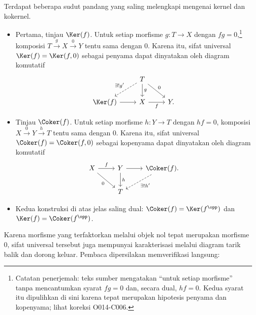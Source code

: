 Terdapat beberapa sudut pandang yang saling melengkapi mengenai kernel dan
kokernel.
\begin{itemize}
	\item Pertama, tinjau $\Ker(f)$. Untuk setiap morfisme $g: T \to X$ dengan
	$fg=0$,\footnote{Catatan penerjemah: teks sumber mengatakan ``untuk setiap
	morfisme'' tanpa mencantumkan syarat $fg=0$ dan, secara dual, $hf=0$.
	Kedua syarat itu dipulihkan di sini karena tepat merupakan hipotesis
	penyama dan kopenyama; lihat koreksi O014-C006.} komposisi
	$T \xrightarrow{g} X \xrightarrow{0} Y$ tentu sama dengan $0$.
	Karena itu, sifat universal $\Ker(f)=\Ker(f,0)$ sebagai penyama dapat
	dinyatakan oleh diagram komutatif
	\[\begin{tikzcd}
		& T \arrow[dashrightarrow, ld, "{\exists! g'}"'] \arrow[d, "g"] \arrow[rd, "0"] & \\
		\Ker(f) \arrow[r] & X \arrow[r, "f"'] & Y .
	\end{tikzcd}\]
	\item Tinjau $\Coker(f)$. Untuk setiap morfisme $h: Y \to T$ dengan
	$hf=0$, komposisi $X \xrightarrow{0} Y \xrightarrow{h} T$ tentu sama dengan
	$0$. Karena itu,
	sifat universal $\Coker(f)=\Coker(f,0)$ sebagai kopenyama dapat dinyatakan
	oleh diagram komutatif
	\[\begin{tikzcd}
		X \arrow[r, "f"] \arrow[rd, "0"'] & Y \arrow[r] \arrow[d, "h"] & \Coker(f) \arrow[dashrightarrow, ld, "{\exists! h'}"] . \\
		& T &
	\end{tikzcd}\]
	\item Kedua konstruksi di atas jelas saling dual:
	$\Coker(f)=\Ker(f^{\opp})$ dan $\Ker(f)=\Coker(f^{\opp})$.
\end{itemize}

Karena morfisme yang terfaktorkan melalui objek nol tepat merupakan morfisme
$0$, sifat universal tersebut juga mempunyai karakterisasi melalui diagram
tarik balik dan dorong keluar. Pembaca dipersilakan memverifikasi langsung:

